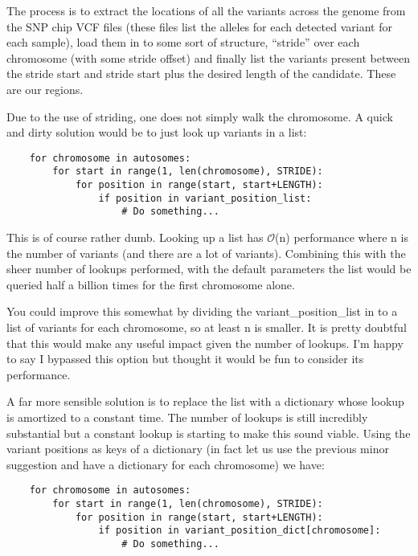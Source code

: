 The process is to extract the locations of all the variants across the genome
from the SNP chip VCF files (these files list the alleles for each detected
variant for each sample), load them in to some sort of structure, “stride” over
each chromosome (with some stride offset) and finally list the variants present
between the stride start and stride start plus the desired length of the
candidate. These are our regions.

Due to the use of striding, one does not simply walk the chromosome. A quick
and dirty solution would be to just look up variants in a list:

\begin{verbatim}
    for chromosome in autosomes:
        for start in range(1, len(chromosome), STRIDE):
            for position in range(start, start+LENGTH):
                if position in variant_position_list:
                    # Do something...
\end{verbatim}

This is of course rather dumb. Looking up a list has $\mathcal{O}$(n) performance
where n is the number of variants (and there are a lot of variants). Combining
this with the sheer number of lookups performed, with the default parameters the
list would be queried half a billion times for the first chromosome alone.

You could improve this somewhat by dividing the variant\_position\_list in to a
list of variants for each chromosome, so at least n is smaller. It is pretty
doubtful that this would make any useful impact given the number of lookups.
I’m happy to say I bypassed this option but thought it would be fun to consider
its performance.

A far more sensible solution is to replace the list with a dictionary
whose lookup is amortized to a constant time. The number of lookups is still
incredibly substantial but a constant lookup is starting to make this sound
viable. Using the variant positions as keys of a dictionary (in fact let us use
the previous minor suggestion and have a dictionary for each chromosome) we
have:

\begin{verbatim}
    for chromosome in autosomes:
        for start in range(1, len(chromosome), STRIDE):
            for position in range(start, start+LENGTH):
                if position in variant_position_dict[chromosome]:
                    # Do something...
\end{verbatim}

